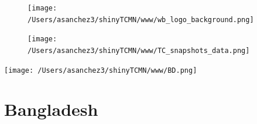 \documentclass{article}\usepackage[]{graphicx}\usepackage[]{color}
\begin{document}
%

\begin{figure}
  \vspace{-3ex} %
  \hspace{-7ex} %
  \texttt{[image: /Users/asanchez3/shinyTCMN/www/wb\_logo\_background.png]}
\end{figure}
\begin{figure}
  \begin{minipage}[t]{0.99\textwidth} %
      \vspace{-30ex}
      \hspace{-2ex}
      \raggedright{\texttt{[image: /Users/asanchez3/shinyTCMN/www/TC\_snapshots\_data.png]}}
  \end{minipage}
\end{figure}
%
\begin{minipage}[t]{0.99\textwidth} %
  \vspace{-1.5cm}
  \begin{minipage}[c]{0.36\textwidth} 
    \begin{minipage}[c]{0.28\textwidth} %
      \texttt{[image: /Users/asanchez3/shinyTCMN/www/BD.png]}
    \end{minipage}
    \begin{minipage}[c]{0.70\textwidth} %
      \section*{\color{blue!40!black}Bangladesh}
    \end{minipage}
  \end{minipage}
  \begin{minipage}[c]{0.63\textwidth} %
    \centering
  \end{minipage}  
\end{minipage} %
\end{document}
